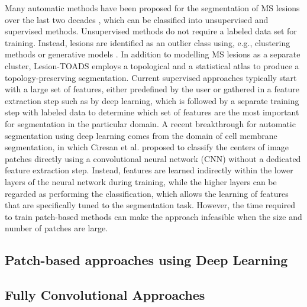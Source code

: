 Many automatic methods have been proposed for the segmentation of MS
lesions over the last two decades \citep{garcia2013}, which can be
classified into unsupervised and supervised methods. Unsupervised methods do not
require a labeled data set for training. Instead, lesions are identified as an
outlier class using, e.g., clustering methods
\citep{souplet2008,shiee2010} or generative models \citep{weiss2013}. In
addition to modelling MS lesions as a separate cluster, Lesion-TOADS
\citep{shiee2010} employs a topological and a statistical atlas to
produce a topology-preserving segmentation. Current supervised approaches
typically start with a large set of features, either predefined by the user
\citep{geremia2010} or gathered in a feature extraction step such as by deep
learning\citep{yoo2014}, which is followed by a separate training step with
labeled data to determine which set of features are the most important for
segmentation in the particular domain.
A recent breakthrough for automatic segmentation using deep learning comes from
the domain of cell membrane segmentation, in which Ciresan et al.
\citep{Ciresan2012} proposed to classify the centers of image patches directly
using a convolutional neural network (CNN) \citep{LeCun1998} without a dedicated
feature extraction step. Instead, features are learned indirectly within the
lower layers of the neural network during training, while the higher layers can
be regarded as performing the classification, which allows the learning of
features that are specifically tuned to the segmentation task. However, the time
required to train patch-based methods can make the approach infeasible when the
size and number of patches are large.


\subsection{Patch-based approaches using Deep Learning}


\subsection{Fully Convolutional Approaches}

